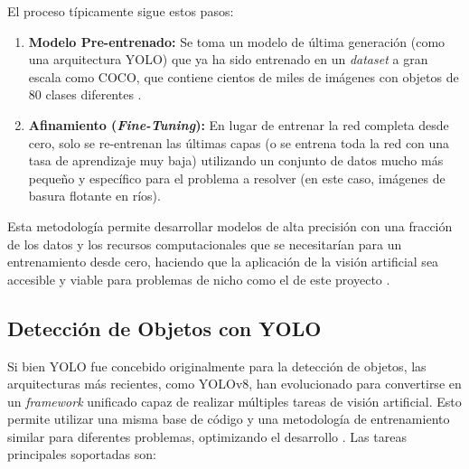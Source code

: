 El proceso típicamente sigue estos pasos:
\begin{enumerate}
    \item \textbf{Modelo Pre-entrenado:} Se toma un modelo de última generación (como una arquitectura YOLO) que ya ha sido entrenado en un \textit{dataset} a gran escala como COCO, que contiene cientos de miles de imágenes con objetos de 80 clases diferentes \cite{lin2014microsoft}.
    \item \textbf{Afinamiento (\textit{Fine-Tuning}):} En lugar de entrenar la red completa desde cero, solo se re-entrenan las últimas capas (o se entrena toda la red con una tasa de aprendizaje muy baja) utilizando un conjunto de datos mucho más pequeño y específico para el problema a resolver (en este caso, imágenes de basura flotante en ríos).
\end{enumerate}

Esta metodología permite desarrollar modelos de alta precisión con una fracción de los datos y los recursos computacionales que se necesitarían para un entrenamiento desde cero, haciendo que la aplicación de la visión artificial sea accesible y viable para problemas de nicho como el de este proyecto \cite{pan2009survey}.

\subsection{Detección de Objetos con YOLO}
\label{subsec:yolo}
Si bien YOLO fue concebido originalmente para la detección de objetos, las arquitecturas más recientes, como YOLOv8, han evolucionado para convertirse en un \textit{framework} unificado capaz de realizar múltiples tareas de visión artificial. Esto permite utilizar una misma base de código y una metodología de entrenamiento similar para diferentes problemas, optimizando el desarrollo \cite{ultralyticsYOLOv8}. Las tareas principales soportadas son:

